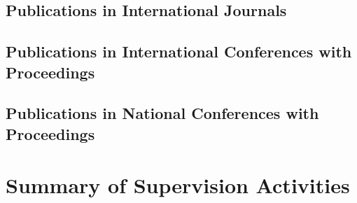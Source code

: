 \documentclass[11pt]{report}
\begin{document}
\subsection{Publications in International Journals}
\printbibliography[keyword={JOURNAL}, heading=none]
\subsection{Publications in International Conferences with Proceedings}
\printbibliography[keyword={CONFERENCE}, heading=none]
\subsection{Publications in National Conferences with Proceedings}
\printbibliography[keyword={NATIONAL}, heading=none]


\pagebreak
\section{Summary of Supervision Activities}
\label{sec:encadrement}
\end{document}
